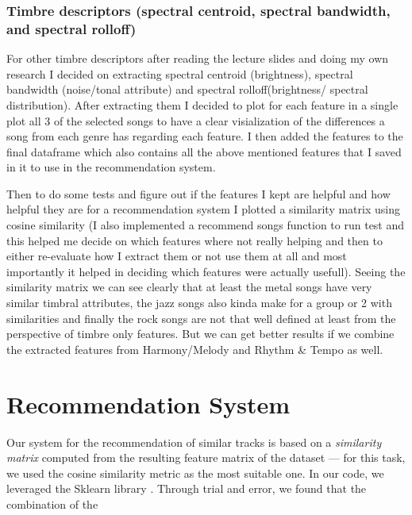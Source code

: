 \documentclass[
  letterpaper,
  twocolumn]{article}
\begin{document}
\subsubsection{Timbre descriptors (spectral centroid, spectral
bandwidth, and spectral
rolloff)}\label{timbre-descriptors-spectral-centroid-spectral-bandwidth-and-spectral-rolloff}

For other timbre descriptors after reading the lecture slides and doing
my own research I decided on extracting spectral centroid (brightness),
spectral bandwidth (noise/tonal attribute) and spectral
rolloff(brightness/ spectral distribution). After extracting them I
decided to plot for each feature in a single plot all 3 of the selected
songs to have a clear visialization of the differences a song from each
genre has regarding each feature. I then added the features to the final
dataframe which also contains all the above mentioned features that I
saved in it to use in the recommendation system.

Then to do some tests and figure out if the features I kept are helpful
and how helpful they are for a recommendation system I plotted a
similarity matrix using cosine similarity (I also implemented a
recommend songs function to run test and this helped me decide on which
features where not really helping and then to either re-evaluate how I
extract them or not use them at all and most importantly it helped in
deciding which features were actually usefull). Seeing the similarity
matrix we can see clearly that at least the metal songs have very
similar timbral attributes, the jazz songs also kinda make for a group
or 2 with similarities and finally the rock songs are not that well
defined at least from the perspective of timbre only features. But we
can get better results if we combine the extracted features from
Harmony/Melody and Rhythm \& Tempo as well.

\section{Recommendation System}\label{recommendation-system}

Our system for the recommendation of similar tracks is based on a
\emph{similarity matrix} computed from the resulting feature matrix of
the dataset --- for this task, we used the cosine similarity metric as
the most suitable one. In our code, we leveraged the Sklearn library
\autocite{scikit-learn}. Through trial and error, we found that the
combination of the
\end{document}

